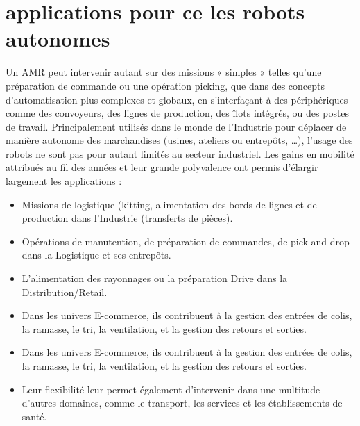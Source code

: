 \section{applications pour ce les robots autonomes}
Un AMR peut intervenir autant sur des missions « simples » telles qu’une préparation de commande ou une opération picking, que dans des concepts d’automatisation plus complexes et globaux, en s’interfaçant à des périphériques comme des convoyeurs, des lignes de production, des îlots intégrés, ou des postes de travail. Principalement utilisés dans le monde de l’Industrie pour déplacer de manière autonome des marchandises (usines, ateliers ou entrepôts, …), l’usage des robots ne sont pas pour autant limités au secteur industriel. Les gains en mobilité attribués au fil des années et leur grande polyvalence ont permis d’élargir largement les applications :
\begin{itemize}
    \item Missions de logistique (kitting, alimentation des bords de lignes et de production dans l’Industrie (transferts de pièces).
    \item Opérations de manutention, de préparation de commandes, de pick and drop dans la Logistique et ses entrepôts.
    \item L’alimentation des rayonnages ou la préparation Drive dans la Distribution/Retail.
    \item Dans les univers E-commerce, ils contribuent à la gestion des entrées de colis, la ramasse, le tri, la ventilation, et la gestion des retours et sorties.
    \item Dans les univers E-commerce, ils contribuent à la gestion des entrées de colis, la ramasse, le tri, la ventilation, et la gestion des retours et sorties.
    \item Leur flexibilité leur permet également d’intervenir dans une multitude d’autres domaines, comme le transport, les services et les établissements de santé.

\end{itemize}



